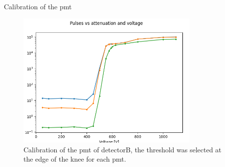 \documentclass[8pt,a4paper]{beamer}
\begin{document}
\begin{frame}{Calibration of the pmt}

\begin{figure}[hbtp]
\centering
\includegraphics[width = 0.8\textwidth]{figures/CalibrationB.png}
\caption{Calibration of the pmt of detectorB, the threshold was selected at the edge of the knee for each pmt.}
\end{figure}

\end{frame}
\end{document}
